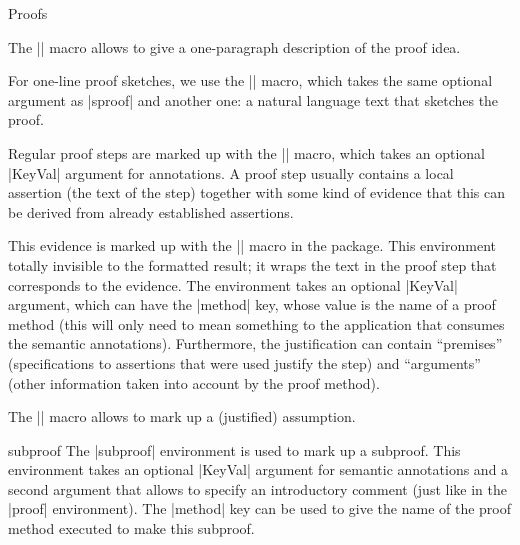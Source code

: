\begin{sfragment}{Proofs}
\begin{function}{\spfidea}
  The |\spfidea| macro allows to give a one-paragraph description of the proof idea.
\end{function}

\begin{function}{\spfsketch}
  For one-line proof sketches, we use the |\spfsketch| macro, which takes the same
  optional argument as |sproof| and another one: a natural language text that sketches
  the proof.
\end{function}

\begin{function}{\spfstep}
  Regular proof steps are marked up with the |\spfstep| macro, which takes an optional
  |KeyVal| argument for annotations. A proof step usually contains a local assertion
  (the text of the step) together with some kind of evidence that this can be derived
  from already established assertions.
\end{function}

\begin{function}{\yield}
  
\end{function}

\begin{function}{\spfjust}
  This evidence is marked up with the |\spfjust| macro in the 
  package. This environment totally invisible to the formatted result; it wraps the text
  in the proof step that corresponds to the evidence. The environment takes an optional
  |KeyVal| argument, which can have the |method| key, whose value is the name of a proof
  method (this will only need to mean something to the application that consumes the
  semantic annotations). Furthermore, the justification can contain ``premises''
  (specifications to assertions that were used justify the step) and ``arguments''
  (other information taken into account by the proof method).
\end{function}

\begin{function}{\assumption}
  The |\assumption| macro allows to mark up a (justified) assumption.
\end{function}

\begin{function}{\justarg}
\end{function}

\begin{environment}{subproof}
  The |subproof| environment is used to mark up a subproof. This environment takes an
  optional |KeyVal| argument for semantic annotations and a second argument that allows
  to specify an introductory comment (just like in the |proof| environment). The
  |method| key can be used to give the name of the proof method
  executed to make this subproof.
\end{environment}


\end{sfragment}
